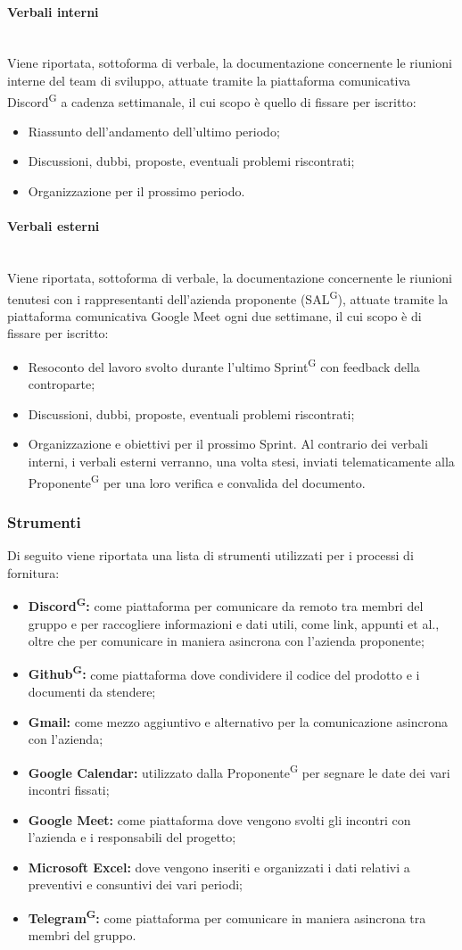 \documentclass[8pt]{article}
\newcommand{\glossterm}[1]{#1\textsuperscript{G}} %
\newcommand{\subsubsubsection}[1]{\paragraph{#1}\mbox{}\\}
\begin{document}
\subsubsubsection{Verbali interni}
Viene riportata, sottoforma di verbale, la documentazione concernente le riunioni interne del team
di sviluppo, attuate tramite la piattaforma comunicativa \glossterm{Discord} a cadenza settimanale,
il cui scopo è quello di fissare per iscritto:
\begin{itemize}
    \item Riassunto dell'andamento dell'ultimo periodo;
    \item Discussioni, dubbi, proposte, eventuali problemi riscontrati;
    \item Organizzazione per il prossimo periodo.
\end{itemize}
\subsubsubsection{Verbali esterni}
Viene riportata, sottoforma di verbale, la documentazione concernente le riunioni tenutesi con i
rappresentanti dell'azienda proponente (\glossterm{SAL}), attuate tramite la piattaforma comunicativa Google Meet ogni due settimane, il cui scopo è di fissare per iscritto:
\begin{itemize}
    \item Resoconto del lavoro svolto durante l'ultimo \glossterm{Sprint} con feedback della controparte;
    \item Discussioni, dubbi, proposte, eventuali problemi riscontrati;
    \item Organizzazione e obiettivi per il prossimo Sprint.
Al contrario dei verbali interni, i verbali esterni verranno, una volta stesi, inviati
        telematicamente alla \glossterm{Proponente} per una loro verifica e convalida del documento.
\end{itemize} 

\subsubsection{Strumenti} 
Di seguito viene riportata una lista di strumenti utilizzati per i processi di fornitura:
\begin{itemize}
    \item \textbf{\glossterm{Discord}:} come piattaforma per comunicare da remoto tra membri del gruppo e per raccogliere informazioni e dati utili, come link, appunti et al., oltre che per comunicare in maniera asincrona con l'azienda proponente;
    \item \textbf{\glossterm{Github}:} come piattaforma dove condividere il codice del prodotto e i documenti da stendere;
    \item \textbf{Gmail:} come mezzo aggiuntivo e alternativo per la comunicazione asincrona con l'azienda;
    \item \textbf{Google Calendar:} utilizzato dalla \glossterm{Proponente} per segnare le date dei vari incontri fissati;
    \item \textbf{Google Meet:} come piattaforma dove vengono svolti gli incontri con l'azienda e i responsabili del progetto; 
    \item \textbf{Microsoft Excel:} dove vengono inseriti e organizzati i dati relativi a preventivi e consuntivi dei vari periodi; 
    \item \textbf{\glossterm{Telegram}:} come piattaforma per comunicare in maniera asincrona tra membri del gruppo. 
\end{itemize}
\end{document}
